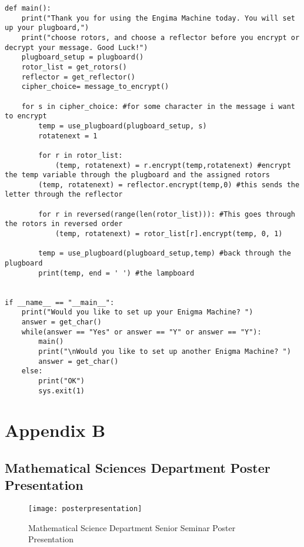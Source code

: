 \documentclass[12pt,letterpaper]{article} %
\begin{document}
\begin{lstlisting}
def main():
    print("Thank you for using the Engima Machine today. You will set up your plugboard,")
    print("choose rotors, and choose a reflector before you encrypt or decrypt your message. Good Luck!")
    plugboard_setup = plugboard()
    rotor_list = get_rotors()
    reflector = get_reflector() 
    cipher_choice= message_to_encrypt()
    
    for s in cipher_choice: #for some character in the message i want to encrypt
        temp = use_plugboard(plugboard_setup, s)
        rotatenext = 1
        
        for r in rotor_list:
            (temp, rotatenext) = r.encrypt(temp,rotatenext) #encrypt the temp variable through the plugboard and the assigned rotors  
        (temp, rotatenext) = reflector.encrypt(temp,0) #this sends the letter through the reflector
       
        for r in reversed(range(len(rotor_list))): #This goes through the rotors in reversed order 
            (temp, rotatenext) = rotor_list[r].encrypt(temp, 0, 1)
           
        temp = use_plugboard(plugboard_setup,temp) #back through the plugboard 
        print(temp, end = ' ') #the lampboard
        

if __name__ == "__main__":
    print("Would you like to set up your Enigma Machine? ")
    answer = get_char()
    while(answer == "Yes" or answer == "Y" or answer == "Y"):
        main()
        print("\nWould you like to set up another Enigma Machine? ")
        answer = get_char()
    else:
        print("OK")
        sys.exit(1)
\end{lstlisting}
\newpage
\section{Appendix B}
\subsection{Mathematical Sciences Department Poster Presentation}
\begin{figure}[!h]
  \centering
  \texttt{[image: posterpresentation]}
  \caption{Mathematical Science Department Senior Seminar Poster Presentation}
  \label{fig:presentation}
\end{figure}
\newpage

\pagestyle{empty}

\pagestyle{empty}
\newpage


\end{document}
